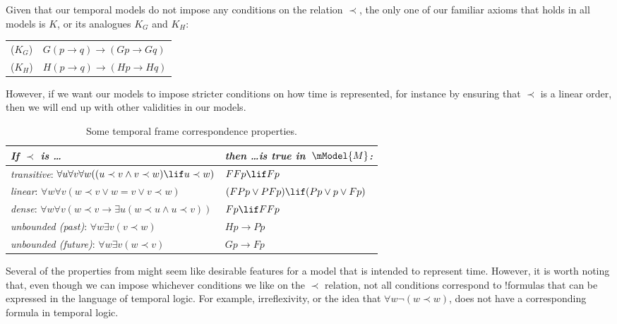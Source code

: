 \documentclass[../../../include/open-logic-section]{subfiles}
\begin{document}


Given that our temporal models do not impose any conditions on the relation $\prec$, the only one of our familiar axioms
that holds in all models is $K$, or its analogues $K_G$ and $K_H$:

\begin{tabular}{p{}l}
($K_G$) & $G(p \to q) \to (Gp \to Gq)$\\
($K_H$) & $H(p \to q) \to (Hp \to Hq)$\\
\end{tabular}

However, if we want our models to impose stricter conditions on how time is represented, for instance by ensuring that
$\prec$ is a linear order, then we will end up with other validities in our models.

\begin{table}[t]
    \begin{tabular}{| p{} || p{} |}
      \hline
      {\emph{If $\prec$ is \dots}} & {\emph{then \dots is true in~$\mModel{M}$:}} \\
      \hline \hline
      \emph{transitive}: \newline
      $\forall u \forall v \forall w ((u \prec v \land v \prec w) \lif u \prec w)$ & 
      $FFp \lif Fp$  \\
      \hline 
      \emph{linear}: \newline
      $\forall w \forall v (w \prec v \lor w = v \lor v \prec w)$ &  
      $(FP p \lor PF p) \lif (Pp \lor p \lor Fp)$ \\
      \hline
      \emph{dense}: \newline
      $\forall w \forall v (w \prec v \to \exists u(w \prec u \land u \prec v))$ &  
      $Fp \lif FFp$ \\
      \hline
      \emph{unbounded (past)}: \newline
      $\forall w \exists v( v \prec w)$ &  
      $Hp \to Pp$ \\
      \hline
      \emph{unbounded (future)}: \newline
      $\forall w \exists v( w \prec v)$ &  
      $Gp \to Fp$ \\

      \hline

    \end{tabular}
    \caption{Some temporal frame correspondence properties.}
  \end{table} 

Several of the properties from  might seem like desirable features 
for a model that is intended to
represent time. However, it is worth noting that, even though we can impose whichever conditions 
we like on the $\prec$ relation, not all conditions correspond to !{formula}s that can be expressed in
the language of temporal logic. For example, irreflexivity, or the idea that $\forall w \lnot (w \prec w)$,
does not have a corresponding formula in temporal logic. 
\end{document}
